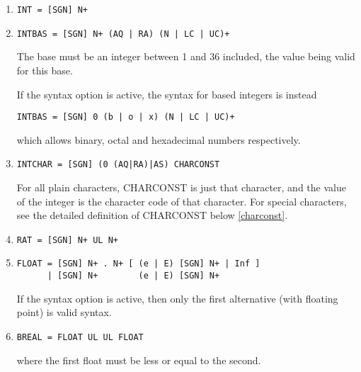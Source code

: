 \begin{enumerate}

\item{}
\begin{verbatim}
INT = [SGN] N+
\end{verbatim}

\item{}
\begin{verbatim}
INTBAS = [SGN] N+ (AQ | RA) (N | LC | UC)+
\end{verbatim}
The base must be an integer between 1 and 36 included, the value
being valid for this base.

If the syntax option  is active, the syntax for
based
integers is instead
\begin{verbatim}
INTBAS = [SGN] 0 (b | o | x) (N | LC | UC)+
\end{verbatim}
which allows binary, octal and hexadecimal numbers respectively.

\item{}
\label{intchar}
\begin{verbatim}
INTCHAR = [SGN] (0 (AQ|RA)|AS) CHARCONST
\end{verbatim}
For all plain characters, CHARCONST is just that character, and the
value of the integer is the character code of that character.
For special characters, see the detailed definition
of CHARCONST below \ref{charconst}.

\item{}
\begin{verbatim}
RAT = [SGN] N+ UL N+
\end{verbatim}

\item{}
\begin{verbatim}
FLOAT = [SGN] N+ . N+ [ (e | E) [SGN] N+ | Inf ]
      | [SGN] N+        (e | E) [SGN] N+
\end{verbatim}
If the syntax option  is active, then
only the first alternative (with floating point) is valid syntax.

\item{}
\begin{verbatim}
BREAL = FLOAT UL UL FLOAT
\end{verbatim}
where the first float must be less or equal to the second.

\end{enumerate}

